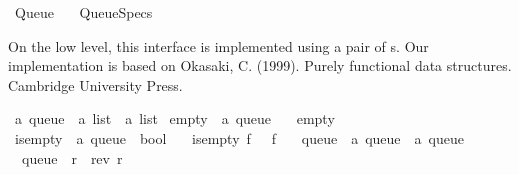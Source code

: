 %
\begin{isabellebody}%
%
%
\isadelimtheory
%
\endisadelimtheory
%
\isatagtheory
{}\isamarkupfalse%
\ Queue\isanewline
\ \ \ Queue{\isacharunderscore}{\kern0pt}Specs\isanewline
{}%
\endisatagtheory
{\isafoldtheory}%
%
\isadelimtheory
%
\endisadelimtheory
%
\begin{isamarkuptext}%
On the low level, this interface is implemented using a pair of s. Our implementation is
based on Okasaki, C. (1999). Purely functional data structures. Cambridge University Press.%
\end{isamarkuptext}\isamarkuptrue%
\isamarkupfalse%
\ {\isacharprime}{\kern0pt}a\ queue\ {\isacharequal}{\kern0pt}\ {\isachardoublequoteopen}{\isacharprime}{\kern0pt}a\ list\ {\isasymtimes}\ {\isacharprime}{\kern0pt}a\ list{\isachardoublequoteclose}\isanewline
\isanewline
{}\isamarkupfalse%
\ empty\ {\isacharcolon}{\kern0pt}{\isacharcolon}{\kern0pt}\ {\isachardoublequoteopen}{\isacharprime}{\kern0pt}a\ queue{\isachardoublequoteclose}\ \isanewline
\ \ {\isachardoublequoteopen}empty\ {\isacharequal}{\kern0pt}\ {\isacharparenleft}{\kern0pt}{\isacharbrackleft}{\kern0pt}{\isacharbrackright}{\kern0pt}{\isacharcomma}{\kern0pt}\ {\isacharbrackleft}{\kern0pt}{\isacharbrackright}{\kern0pt}{\isacharparenright}{\kern0pt}{\isachardoublequoteclose}\isanewline
\isanewline
{}\isamarkupfalse%
\ is{\isacharunderscore}{\kern0pt}empty\ {\isacharcolon}{\kern0pt}{\isacharcolon}{\kern0pt}\ {\isachardoublequoteopen}{\isacharprime}{\kern0pt}a\ queue\ {\isasymRightarrow}\ bool{\isachardoublequoteclose}\ \isanewline
\ \ {\isachardoublequoteopen}is{\isacharunderscore}{\kern0pt}empty\ {\isacharparenleft}{\kern0pt}f{\isacharcomma}{\kern0pt}\ {\isacharunderscore}{\kern0pt}{\isacharparenright}{\kern0pt}\ {\isasymlongleftrightarrow}\ f\ {\isacharequal}{\kern0pt}\ {\isacharbrackleft}{\kern0pt}{\isacharbrackright}{\kern0pt}{\isachardoublequoteclose}\isanewline
\isanewline
{}\isamarkupfalse%
\ queue\ {\isacharcolon}{\kern0pt}{\isacharcolon}{\kern0pt}\ {\isachardoublequoteopen}{\isacharprime}{\kern0pt}a\ queue\ {\isasymRightarrow}\ {\isacharprime}{\kern0pt}a\ queue{\isachardoublequoteclose}\ \isanewline
\ \ {\isachardoublequoteopen}queue\ {\isacharparenleft}{\kern0pt}{\isacharbrackleft}{\kern0pt}{\isacharbrackright}{\kern0pt}{\isacharcomma}{\kern0pt}\ r{\isacharparenright}{\kern0pt}\ {\isacharequal}{\kern0pt}\ {\isacharparenleft}{\kern0pt}rev\ r{\isacharcomma}{\kern0pt}\ {\isacharbrackleft}{\kern0pt}{\isacharbrackright}{\kern0pt}{\isacharparenright}{\kern0pt}{\isachardoublequoteclose}\ {\isacharbar}{\kern0pt}\isanewline

\end{isabellebody}
